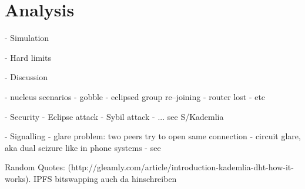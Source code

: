 \chapter{Analysis}
- Simulation

- Hard limits

- Discussion

- nucleus scenarios
    - gobble
    - eclipsed group re–joining
    - router lost
    - etc
    

- Security
    - Eclipse attack
    - Sybil attack
    - ... see S/Kademlia

- Signalling
    - glare problem: two peers try to open same connection
        - circuit glare, aka dual seizure like in phone systems
        - see \cite[pp. 194-194]{signaling-systems-book}


Random Quotes:
(http://gleamly.com/article/introduction-kademlia-dht-how-it-works). IPFS bitswapping auch da hinschreiben
